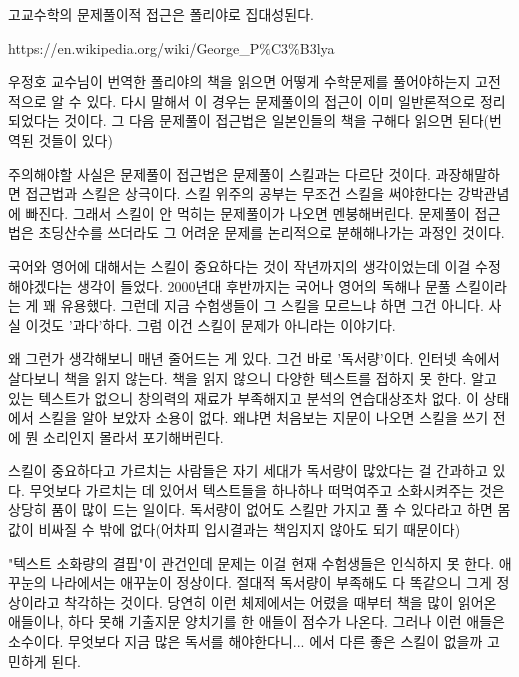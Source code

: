 고교수학의 문제풀이적 접근은 폴리야로 집대성된다.
\vspace{5mm}

https://en.wikipedia.org/wiki/George_P$\%$C3$\%$B3lya
\vspace{5mm}

우정호 교수님이 번역한 폴리야의 책을 읽으면 어떻게 수학문제를 풀어야하는지 고전적으로 알 수 있다.
다시 말해서 이 경우는 문제풀이의 접근이 이미 일반론적으로 정리되었다는 것이다.
그 다음 문제풀이 접근법은 일본인들의 책을 구해다 읽으면 된다(번역된 것들이 있다)
\vspace{5mm}

주의해야할 사실은 문제풀이 접근법은 문제풀이 스킬과는 다르단 것이다. 과장해말하면 접근법과 스킬은 상극이다.
스킬 위주의 공부는 무조건 스킬을 써야한다는 강박관념에 빠진다. 그래서 스킬이 안 먹히는 문제풀이가 나오면 멘붕해버린다.
문제풀이 접근법은 초딩산수를 쓰더라도 그 어려운 문제를 논리적으로 분해해나가는 과정인 것이다.
\vspace{5mm}

국어와 영어에 대해서는 스킬이 중요하다는 것이 작년까지의 생각이었는데 이걸 수정해야겠다는 생각이 들었다.
2000년대 후반까지는 국어나 영어의 독해나 문풀 스킬이라는 게 꽤 유용했다.
그런데 지금 수험생들이 그 스킬을 모르느냐 하면 그건 아니다. 사실 이것도 '과다'하다.
그럼 이건 스킬이 문제가 아니라는 이야기다.
\vspace{5mm}

왜 그런가 생각해보니 매년 줄어드는 게 있다. 그건 바로 '독서량'이다.
인터넷 속에서 살다보니 책을 읽지 않는다. 책을 읽지 않으니 다양한 텍스트를 접하지 못 한다.
알고 있는 텍스트가 없으니 창의력의 재료가 부족해지고 분석의 연습대상조차 없다.
이 상태에서 스킬을 알아 보았자 소용이 없다. 왜냐면 처음보는 지문이 나오면 스킬을 쓰기 전에 뭔 소리인지 몰라서 포기해버린다.
\vspace{5mm}

스킬이 중요하다고 가르치는 사람들은 자기 세대가 독서량이 많았다는 걸 간과하고 있다.
무엇보다 가르치는 데 있어서 텍스트들을 하나하나 떠먹여주고 소화시켜주는 것은 상당히 품이 많이 드는 일이다.
독서량이 없어도 스킬만 가지고 풀 수 있다라고 하면 몸값이 비싸질 수 밖에 없다(어차피 입시결과는 책임지지 않아도 되기 때문이다)
\vspace{5mm}

"텍스트 소화량의 결핍"이 관건인데 문제는 이걸 현재 수험생들은 인식하지 못 한다.
애꾸눈의 나라에서는 애꾸눈이 정상이다. 절대적 독서량이 부족해도 다 똑같으니 그게 정상이라고 착각하는 것이다.
당연히 이런 체제에서는 어렸을 때부터 책을 많이 읽어온 애들이나, 하다 못해 기출지문 양치기를 한 애들이 점수가 나온다.
그러나 이런 애들은 소수이다. 무엇보다 지금 많은 독서를 해야한다니... 에서 다른 좋은 스킬이 없을까 고민하게 된다.
\vspace{5mm}

